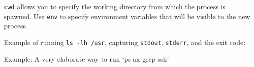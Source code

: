 \texttt{cwd} allows you to specify the working directory from which the
process is spawned. Use \texttt{env} to specify environment variables
that will be visible to the new process.

Example of running \texttt{ls -lh /usr}, capturing \texttt{stdout},
\texttt{stderr}, and the exit code:

\begin{Shaded}
\begin{Highlighting}[]
 \NormalTok{),}
    \NormalTok{,}
    \NormalTok{, [}\NormalTok{, }\NormalTok{]);}

\NormalTok{(}\NormalTok{, } 
  \NormalTok{(} 
\NormalTok{\});}

\NormalTok{(}\NormalTok{, } 
  \NormalTok{(} 
\NormalTok{\});}

\NormalTok{(}\NormalTok{, } 
  \NormalTok{(} 
\NormalTok{\});}
\end{Highlighting}
\end{Shaded}

Example: A very elaborate way to run `ps ax \textbar{} grep ssh'

